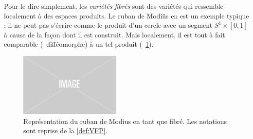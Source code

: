 Pour le dire simplement, les \emph{variétés fibrés} sont des variétés qui ressemble localement à des espaces produits. 
Le ruban de Modiüs en est un exemple typique : il ne peut pas s'écrire comme le produit d'un cercle avec un segment $S^{1}\times [0,1]$ à cause de la façon dont il est construit. Mais localement, il est tout à fait comparable (\ie~difféomorphe) à un tel produit (\cf~\cref{fig:ruban2modius}).
\begin{figure}[h]
	\includegraphics[width=0.45\textwidth]{fig/placeholder}
	\caption[Ruban de Mobius comme variété fibrée]{Représentation du ruban de Modius en tant que fibré. Les notations sont reprise de la \cref{def:VFP}.}
	\label{fig:ruban2modius}
\end{figure}
\skipl

